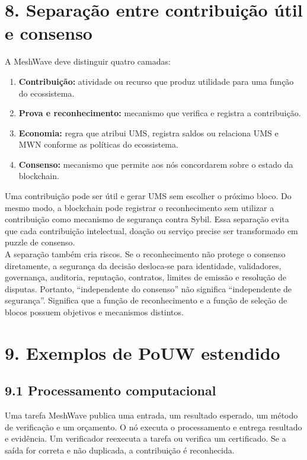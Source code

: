 \documentclass[12pt,a4paper]{article}
\begin{document}
\section{8. Separação entre contribuição útil e consenso}

A MeshWave deve distinguir quatro camadas:\\

\begin{enumerate}
\item \textbf{Contribuição:} atividade ou recurso que produz utilidade para uma função do ecossistema.
\item \textbf{Prova e reconhecimento:} mecanismo que verifica e registra a contribuição.
\item \textbf{Economia:} regra que atribui UMS, registra saldos ou relaciona UMS e MWN conforme as políticas do ecossistema.
\item \textbf{Consenso:} mecanismo que permite aos nós concordarem sobre o estado da blockchain.

\end{enumerate}
Uma contribuição pode ser útil e gerar UMS sem escolher o próximo bloco. Do mesmo modo, a blockchain pode registrar o reconhecimento sem utilizar a contribuição como mecanismo de segurança contra Sybil. Essa separação evita que cada contribuição intelectual, doação ou serviço precise ser transformado em puzzle de consenso.\\

A separação também cria riscos. Se o reconhecimento não protege o consenso diretamente, a segurança da decisão desloca-se para identidade, validadores, governança, auditoria, reputação, contratos, limites de emissão e resolução de disputas. Portanto, “independente do consenso” não significa “independente de segurança”. Significa que a função de reconhecimento e a função de seleção de blocos possuem objetivos e mecanismos distintos.\\


\section{9. Exemplos de PoUW estendido}

\subsection{9.1 Processamento computacional}

Uma tarefa MeshWave publica uma entrada, um resultado esperado, um método de verificação e um orçamento. O nó executa o processamento e entrega resultado e evidência. Um verificador reexecuta a tarefa ou verifica um certificado. Se a saída for correta e não duplicada, a contribuição é reconhecida.\\
\end{document}
